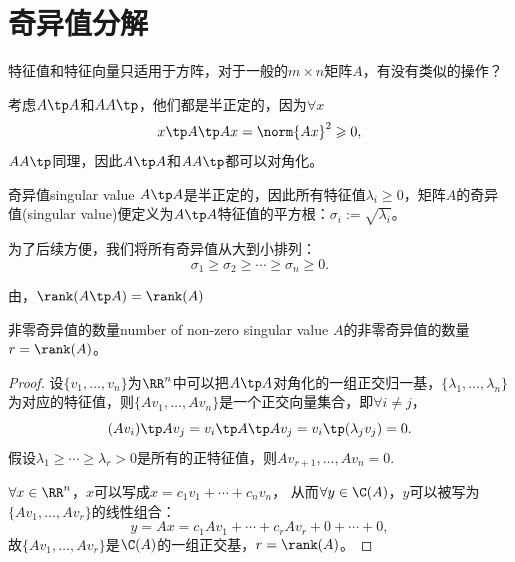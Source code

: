 \chapter{奇异值分解}
特征值和特征向量只适用于方阵，对于一般的$m\times n$矩阵$A$，有没有类似的操作？

\noindent
考虑$A\tp A$和$AA\tp$，他们都是半正定的，因为$\forall x$
\[
	x\tp A\tp Ax=\norm{Ax}^2\geqslant 0,
\]
$AA\tp$同理，因此$A\tp A$和$AA\tp$都可以对角化。
\begin{definition}{奇异值}{singular value}
	$A\tp A$是半正定的，因此所有特征值$\lambda_i\geqslant 0$，矩阵$A$的奇异值(singular value)便定义为$A\tp A$特征值的平方根：$\sigma_i:=\sqrt{\lambda_i}$。

	为了后续方便，我们将所有奇异值从大到小排列：
	\[
		\sigma_1\geqslant\sigma_2\geqslant\cdots\geqslant\sigma_n\geqslant 0.
	\]
\end{definition}
由，$\rank(A\tp A)=\rank(A)$
\begin{theorem}{非零奇异值的数量}{number of non-zero singular value}
	$A$的非零奇异值的数量$r=\rank(A)$。
\end{theorem}
\begin{proof}
	设$\{v_1,\ldots,v_n\}$为$\RR^n$中可以把$A\tp A$对角化的一组正交归一基，$\{\lambda_1,\ldots,\lambda_n\}$为对应的特征值，则$\{Av_1,\ldots,Av_n\}$是一个正交向量集合，即$\forall i\neq j$，
	\[
		(Av_i)\tp Av_j=v_i\tp A\tp Av_j=v_i\tp(\lambda_jv_j)=0.
	\]
	假设$\lambda_1\geqslant\cdots\geqslant\lambda_r>0$是所有的正特征值，则$Av_{r+1},\ldots,Av_n=0$.
	
	$\forall x\in\RR^n$，$x$可以写成$x=c_1v_1+\cdots+c_nv_n$，
	从而$\forall y\in\C(A)$，$y$可以被写为$\{Av_1,\ldots,Av_r\}$的线性组合：
	\[
		y=Ax=c_1Av_1+\cdots+c_rAv_r+0+\cdots+0,
	\]
	故$\{Av_1,\ldots,Av_r\}$是$\C(A)$的一组正交基，$r=\rank(A)$。
\end{proof}
